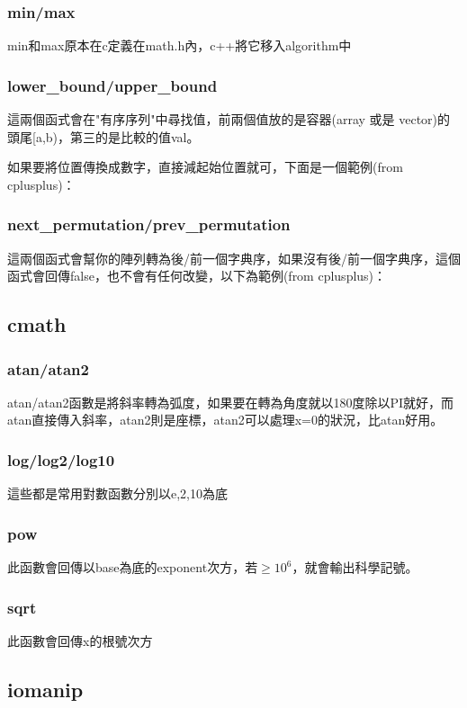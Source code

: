 \subsubsection{min/max}
min和max原本在c定義在math.h內，c++將它移入algorithm中

\subsubsection{lower\_bound/upper\_bound}
這兩個函式會在"有序序列"中尋找值，前兩個值放的是容器(array 或是 vector)的頭尾[a,b)，第三的是比較的值val。

如果要將位置傳換成數字，直接減起始位置就可，下面是一個範例(from cplusplus)：

\subsubsection{next\_permutation/prev\_permutation}
這兩個函式會幫你的陣列轉為後/前一個字典序，如果沒有後/前一個字典序，這個函式會回傳false，也不會有任何改變，以下為範例(from cplusplus)：

\subsection{cmath}
\subsubsection{atan/atan2} 
atan/atan2函數是將斜率轉為弧度，如果要在轉為角度就以180度除以PI就好，而atan直接傳入斜率，atan2則是座標，atan2可以處理x=0的狀況，比atan好用。

\subsubsection{log/log2/log10}
這些都是常用對數函數分別以e,2,10為底

\subsubsection{pow}
此函數會回傳以base為底的exponent次方，若$\geq 10^6$，就會輸出科學記號。

\subsubsection{sqrt}
此函數會回傳x的根號次方

\subsection{iomanip}
